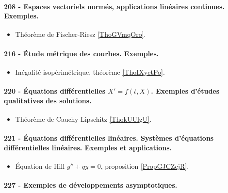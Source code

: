 \paragraph{208 - Espaces vectoriels normés, applications linéaires continues. Exemples.}
\begin{itemize}
    \item Théorème de Fischer-Riesz \ref{ThoGVmqOro}.
\end{itemize}
\paragraph{216 - Étude métrique des courbes. Exemples.}
\begin{itemize}
    \item Inégalité isopérimétrique, théorème \ref{ThoIXyctPo}.
\end{itemize}
\paragraph{220 - Équations différentielles $X' = f (t , X )$. Exemples d’études qualitatives des solutions.}
\begin{itemize}
    \item Théorème de Cauchy-Lipschitz \ref{ThokUUlgU}.
\end{itemize}
\paragraph{221 - Équations différentielles linéaires. Systèmes d’équations différentielles linéaires. Exemples et applications.}
\begin{itemize}
    \item Équation de Hill \( y''+qy=0\), proposition \ref{PropGJCZcjR}.
\end{itemize}
\paragraph{227 - Exemples de développements asymptotiques.}
